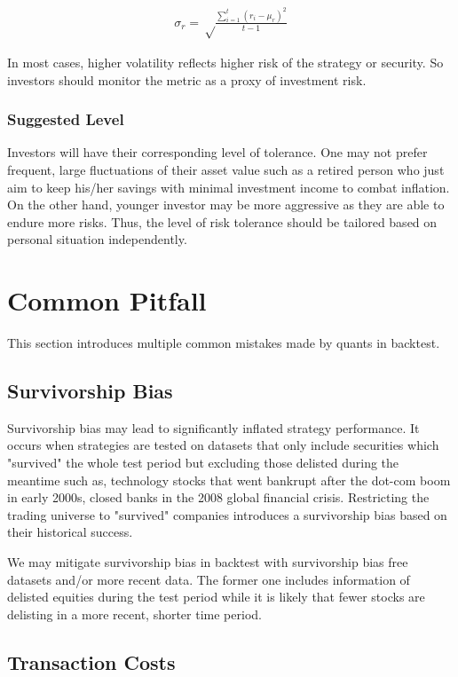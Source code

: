 \documentclass[12pt]{article}
\begin{document}
\begin{align*}
  \sigma_r = \sqrt\frac{\sum_{i=1}^t (r_i-\mu_r)^2}{t-1}
\end{align*}

In most cases, higher volatility reflects higher risk of the strategy or security. So investors should monitor the metric as a proxy of investment risk.

\subsubsection*{Suggested Level}

Investors will have their corresponding level of tolerance. One may not prefer frequent, large fluctuations of their asset value such as a retired person who just aim to keep his/her savings with minimal investment income to combat inflation. On the other hand, younger investor may be more aggressive as they are able to endure more risks. Thus, the level of risk tolerance should be tailored based on personal situation independently.


\section{Common Pitfall}

This section introduces multiple common mistakes made by quants in backtest.

\subsection{Survivorship Bias}

Survivorship bias may lead to significantly inflated strategy performance. It occurs when strategies are tested on datasets that only include securities which "survived" the whole test period but excluding those delisted during the meantime such as, technology stocks that went bankrupt after the dot-com boom in early 2000s, closed banks in the 2008 global financial crisis. Restricting the trading universe to "survived" companies introduces a survivorship bias based on their historical success.

We may mitigate survivorship bias in backtest with survivorship bias free datasets and/or more recent data. The former one includes information of delisted equities during the test period while it is likely that fewer stocks are delisting in a more recent, shorter time period.

\subsection{Transaction Costs}
\end{document}
